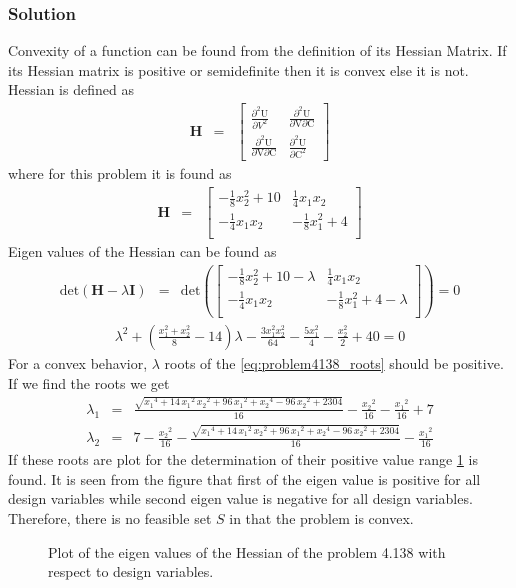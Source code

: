 \documentclass[]{report}
\begin{document}
\subsubsection*{Solution}
Convexity of a function can be found from the definition of its Hessian Matrix. If its Hessian matrix is positive or semidefinite then it is convex else it is not. Hessian is defined as
\begin{eqnarray*}
\mathbf H &=& \left[ \begin{array}{cc}
\frac{\partial^2 \mathrm U}{\partial  V^2} &\frac{\partial^2 \mathrm U}{\partial \mathrm V \partial \mathrm C}\\
\frac{\partial^2 \mathrm U}{\partial \mathrm V \partial \mathrm C} & \frac{\partial^2 \mathrm U}{\partial \mathrm C^2}
\end{array}\right]
\end{eqnarray*}
where for this problem it is found as 
\begin{eqnarray*}
\mathbf H &=& \left[ \begin{array}{cc}
-\frac{1}{8}x_2^2+10 &\frac{1}{4}x_1 x_2\\
-\frac{1}{4}x_1 x_2&-\frac{1}{8}x_1^2+4\\
\end{array}\right]
\end{eqnarray*}
Eigen values of the Hessian can be found as
\begin{eqnarray*}
\mathrm{det}\left(\mathbf{H}-\lambda \mathbf{I}\right)&=&\mathrm{det}\left(\left[\begin{array}{cc}
-\frac{1}{8}x_2^2+10 -\lambda&\frac{1}{4}x_1 x_2\\
-\frac{1}{4}x_1 x_2&-\frac{1}{8}x_1^2+4-\lambda\\
\end{array}\right]\right)=0
\end{eqnarray*}
\begin{eqnarray}\label{eq:problem4138_roots}
\lambda^2+\left(\frac{x_1^2+x_2^2}{8}-14\right)\lambda - \frac{3x_1^2x_2^2}{64}-\frac{5x_1^2}{4}-\frac{x_2^2}{2}+40=0
\end{eqnarray}
For a convex behavior, $\lambda$ roots of the \cref{eq:problem4138_roots} should be positive. If we find the roots we get
\begin{eqnarray*}
\lambda_1&=& \frac{\sqrt{{x_{1}}^4 + 14\, {x_{1}}^2\, {x_{2}}^2 + 96\, {x_{1}}^2 + {x_{2}}^4 - 96\, {x_{2}}^2 + 2304}}{16} - \frac{{x_{2}}^2}{16} - \frac{{x_{1}}^2}{16} + 7\\  \lambda_2&=& 7 - \frac{{x_{2}}^2}{16} - \frac{\sqrt{{x_{1}}^4 + 14\, {x_{1}}^2\, {x_{2}}^2 + 96\, {x_{1}}^2 + {x_{2}}^4 - 96\, {x_{2}}^2 + 2304}}{16} - \frac{{x_{1}}^2}{16}
\end{eqnarray*}
If these roots are plot for the determination of their positive value range \cref{fig:rootsplot} is found. It is seen from the figure that first of the eigen value is positive for all design variables while second eigen value is negative for all design variables. Therefore, there is no feasible set $S$ in that the problem is convex.
\begin{figure}[h!]

\caption{Plot of the eigen values of the Hessian of the problem 4.138 with respect to design variables.}
\label{fig:rootsplot}
\end{figure}
\end{document}
